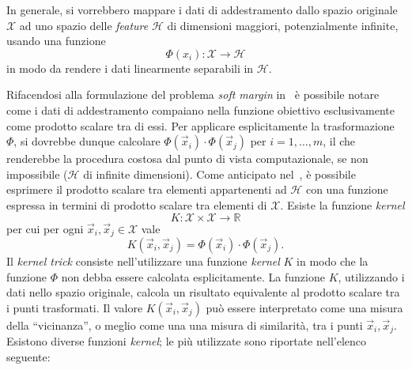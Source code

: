 In generale, si vorrebbero mappare i dati di addestramento dallo spazio originale $\mathcal{X}$ ad uno spazio delle \emph{feature} $\mathcal{H}$ di dimensioni maggiori, potenzialmente infinite, usando una funzione
\begin{equation}
\label{eq:generic_kernel_mapping}
\Phi(x_i) : \mathcal{X} \rightarrow \mathcal{H}
\end{equation}
in modo da rendere i dati linearmente separabili in $\mathcal{H}$.


Rifacendosi alla formulazione del problema \emph{soft margin} in~ è possibile notare come i dati di addestramento compaiano nella funzione obiettivo esclusivamente come prodotto scalare tra di essi. 
Per applicare esplicitamente la trasformazione $\Phi$, si dovrebbe dunque calcolare $\Phi(\Vec{x}_i)\cdot\Phi(\Vec{x}_j)$ per $i=1,\dots,m$, il che renderebbe la procedura costosa dal punto di vista computazionale, se non impossibile ($\mathcal{H}$ di infinite dimensioni). 
Come anticipato nel~, è possibile esprimere il prodotto scalare tra elementi appartenenti ad $\mathcal{H}$ con una funzione espressa in termini di prodotto scalare tra elementi di $\mathcal{X}$. 
Esiste la funzione \emph{kernel}
\begin{equation*}
    K: \mathcal{X} \times \mathcal{X} \rightarrow \mathbb{R} 
\end{equation*}
per cui per ogni $\Vec{x}_i, \Vec{x}_j \in \mathcal{X}$ vale
\begin{equation*}
    K(\Vec{x}_i, \Vec{x}_j) = \Phi(\Vec{x}_i) \cdot \Phi(\Vec{x}_j).
\end{equation*}
Il \emph{kernel trick} consiste nell'utilizzare una funzione \emph{kernel} $K$ in modo che la funzione $\Phi$ non debba essere calcolata esplicitamente. 
La funzione $K$, utilizzando i dati nello spazio originale, calcola un risultato equivalente al prodotto scalare tra i punti trasformati. 
Il valore $K(\Vec{x}_i, \Vec{x}_j)$ può essere interpretato come una misura della ``vicinanza'', o meglio come una una misura di similarità, tra i punti $\Vec{x}_i, \Vec{x}_j$.
Esistono diverse funzioni \emph{kernel}; le più utilizzate sono riportate nell'elenco seguente:

